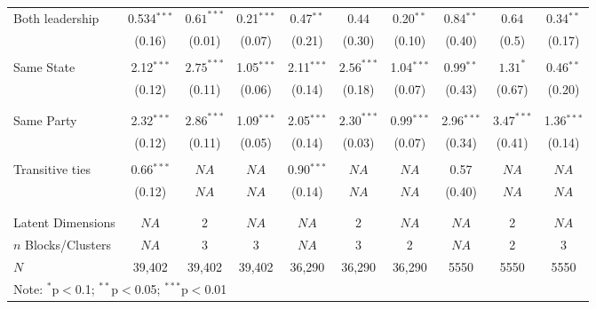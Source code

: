\documentclass[fleqn,12pt]{wlscirep}
\begin{document}
\begin{landscape}
\begin{table}[!htbp]
\begin{tabular}{lccccccccc}
Both leadership & 0.534$^{***}$ &  $0.61^{***}$     &0.21$^{***}$ &    
0.47$^{**}$ &   $0.44$   &0.20$^{**}$ & 
0.84$^{**}$ & $0.64$&0.34$^{**}$ \\ 
  & (0.16) & (0.01)&  (0.07) & 
  (0.21) & (0.30)& (0.10)  &
  (0.40)   & (0.5)& (0.17)
    \\ 
  & & & \\ 
Same State & 2.12$^{***}$ &$2.75^{***}$& 1.05$^{***}$ &
2.11$^{***}$ &$2.56^{***}$ &1.04$^{***}$ & 
0.99$^{**}$ &$1.31^{*}$& 0.46$^{**}$\\ 
  & (0.12) &(0.11)& (0.06) &
  (0.14) &(0.18)& (0.07) &
  (0.43) &(0.67)& (0.20)\\ 
      \\ 
  & & & \\ 
Same Party & 2.32$^{***}$ &$2.86^{***}$ & 1.09$^{***}$ & 
2.05$^{***}$ &$2.30^{***}$& 0.99$^{***}$&
2.96$^{***}$ &$3.47^{***}$&1.36$^{***}$\\ 
  & (0.12) &(0.11)& (0.05) &
   (0.14) &(0.03)& (0.07)&
   (0.34) &(0.41)& (0.14) \\
  & & & \\ 
 Transitive ties & 0.66$^{***}$ &$NA$ &$NA$& 0.90$^{***}$ &$NA$&$NA$&0.57&$NA$& $NA$\\ 
  & (0.12) &$NA$ &$NA$& (0.14) &$NA$ &$NA$& (0.40)&$NA$ &$NA$ \\ 
  & & & \\ 
\hline \\[-1.8ex] 
Latent Dimensions & $NA$ & 2 & $NA$ & $NA$ & 2 & $NA$ & $NA$ & 2 &$NA$\\
$n$ Blocks/Clusters & $NA$ & 3 & 3 & $NA$ & 3 & 2 & $NA$ & 2 & 3\\
$N$ & 39,402  & 39,402 &  39,402 &36,290 &36,290 &  36,290 &5550& 5550&  5550\\  
\hline
\multicolumn{4}{l}{\scriptsize{Note: {$^{*}$p$<$0.1; $^{**}$p$<$0.05; $^{***}$p$<$0.01}}}
\end{tabular}
\end{table}
\end{landscape}
\end{document}
